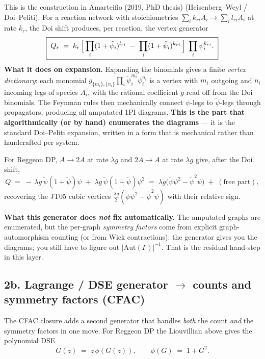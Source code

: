 \documentclass[11pt,a4paper]{article}
\begin{document}
This is the construction in Amarteifio (2019, PhD thesis) (Heisenberg--Weyl / Doi--Peliti). For a reaction network with stoichiometries $\sum_i k_{ri}A_i \to \sum_i l_{ri}A_i$ at rate $k_r$, the Doi shift produces, per reaction, the vertex generator
\[
\boxed{\;
  Q_r \;=\; k_r\,\Bigl[\,\prod_i (1+\tilde\psi_i)^{l_{ri}} \;-\; \prod_i (1+\tilde\psi_i)^{k_{ri}}\,\Bigr]\;\prod_i \psi_i^{k_{ri}}.
\;}
\]
\textbf{What it does on expansion.} Expanding the binomials gives a finite \emph{vertex dictionary}: each monomial $g_{\{m_i\},\{n_i\}}\prod_i \tilde\psi_i^{m_i}\psi_i^{n_i}$ is a vertex with $m_i$ outgoing and $n_i$ incoming legs of species $A_i$, with the rational coefficient $g$ read off from the Doi binomials. The Feynman rules then mechanically connect $\psi$-legs to $\tilde\psi$-legs through propagators, producing all amputated 1PI diagrams. \textbf{This is the part that algorithmically (or by hand) enumerates the diagrams} --- it is the standard Doi--Peliti expansion, written in a form that is mechanical rather than handcrafted per system.

For Reggeon DP, $A \to 2A$ at rate $\lambda g$ and $2A \to A$ at rate $\lambda g$ give, after the Doi shift,
\[
Q \;=\; -\,\lambda g\,\tilde\psi(1+\tilde\psi)\psi \;+\; \lambda g\,\tilde\psi(1+\tilde\psi)\psi^2 \;=\; \lambda g\bigl(\tilde\psi\psi^2 - \tilde\psi^2\psi\bigr) \;+\;(\text{free part}),
\]
recovering the JT05 cubic vertices $\tfrac{\lambda g}{2}(\tilde\psi\psi^2 - \tilde\psi^2\psi)$ with their relative sign.

\textbf{What this generator does \emph{not} fix automatically.} The amputated graphs are enumerated, but the per-graph \emph{symmetry factors} come from explicit graph-automorphism counting (or from Wick contractions): the generator gives you the diagrams; you still have to figure out $|\mathrm{Aut}(\Gamma)|^{-1}$. That is the residual hand-step in this layer.

\subsection*{2b. Lagrange / DSE generator $\to$ counts and symmetry factors (CFAC)}

The CFAC closure adds a second generator that handles \emph{both} the count \emph{and} the symmetry factors in one move. For Reggeon DP the Liouvillian above gives the polynomial DSE
\[
  \boxed{\;G(z) \;=\; z\,\phi(G(z)), \qquad \phi(G) \;=\; 1 + G^2.\;}
\]
\end{document}

